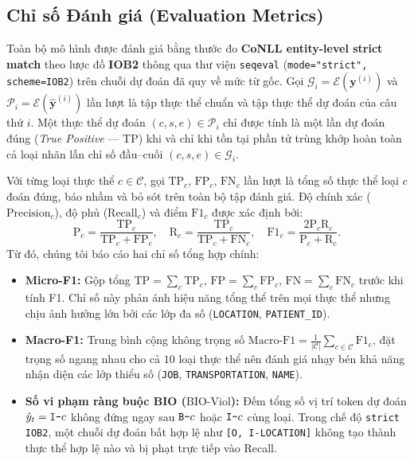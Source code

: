 \documentclass[11pt,a4paper,twocolumn]{article}
\begin{document}
\subsection{Chỉ số Đánh giá (Evaluation Metrics)}
\label{sec:metrics}
Toàn bộ mô hình được đánh giá bằng thước đo \textbf{CoNLL entity-level strict match} theo lược đồ \textbf{IOB2} thông qua thư viện \texttt{seqeval} (\texttt{mode="strict", scheme=IOB2}) trên chuỗi dự đoán đã quy về mức từ gốc. Gọi $\mathcal{G}_i = \mathcal{E}(\mathbf{y}^{(i)})$ và $\mathcal{P}_i = \mathcal{E}(\hat{\mathbf{y}}^{(i)})$ lần lượt là tập thực thể chuẩn và tập thực thể dự đoán của câu thứ $i$. Một thực thể dự đoán $(c, s, e) \in \mathcal{P}_i$ chỉ được tính là một lần dự đoán đúng (\textit{True Positive} — TP) khi và chỉ khi tồn tại phần tử trùng khớp hoàn toàn cả loại nhãn lẫn chỉ số đầu--cuối $(c, s, e) \in \mathcal{G}_i$.

Với từng loại thực thể $c \in \mathcal{C}$, gọi $\text{TP}_c$, $\text{FP}_c$, $\text{FN}_c$ lần lượt là tổng số thực thể loại $c$ đoán đúng, báo nhầm và bỏ sót trên toàn bộ tập đánh giá. Độ chính xác ($\text{Precision}_c$), độ phủ ($\text{Recall}_c$) và điểm $\text{F1}_c$ được xác định bởi:
\begin{equation}
  \text{P}_c = \frac{\text{TP}_c}{\text{TP}_c + \text{FP}_c}, \quad
  \text{R}_c = \frac{\text{TP}_c}{\text{TP}_c + \text{FN}_c}, \quad
  \text{F1}_c = \frac{2 \text{P}_c \text{R}_c}{\text{P}_c + \text{R}_c}.
\end{equation}
Từ đó, chúng tôi báo cáo hai chỉ số tổng hợp chính:
\begin{itemize}
  \item \textbf{Micro-F1:} Gộp tổng $\text{TP} = \sum_{c} \text{TP}_c$, $\text{FP} = \sum_{c} \text{FP}_c$, $\text{FN} = \sum_{c} \text{FN}_c$ trước khi tính F1. Chỉ số này phản ánh hiệu năng tổng thể trên mọi thực thể nhưng chịu ảnh hưởng lớn bởi các lớp đa số (\texttt{LOCATION}, \texttt{PATIENT\_ID}).
  \item \textbf{Macro-F1:} Trung bình cộng không trọng số $\text{Macro-F1} = \frac{1}{|\mathcal{C}|} \sum_{c \in \mathcal{C}} \text{F1}_c$, đặt trọng số ngang nhau cho cả $10$ loại thực thể nên đánh giá nhạy bén khả năng nhận diện các lớp thiểu số (\texttt{JOB}, \texttt{TRANSPORTATION}, \texttt{NAME}).
  \item \textbf{Số vi phạm ràng buộc BIO ($\text{BIO-Viol}$):} Đếm tổng số vị trí token dự đoán $\hat{y}_t = \text{\texttt{I-}}c$ không đứng ngay sau $\text{\texttt{B-}}c$ hoặc $\text{\texttt{I-}}c$ cùng loại. Trong chế độ \texttt{strict IOB2}, một chuỗi dự đoán bất hợp lệ như \texttt{[O, I-LOCATION]} không tạo thành thực thể hợp lệ nào và bị phạt trực tiếp vào Recall.
\end{itemize}
\end{document}
